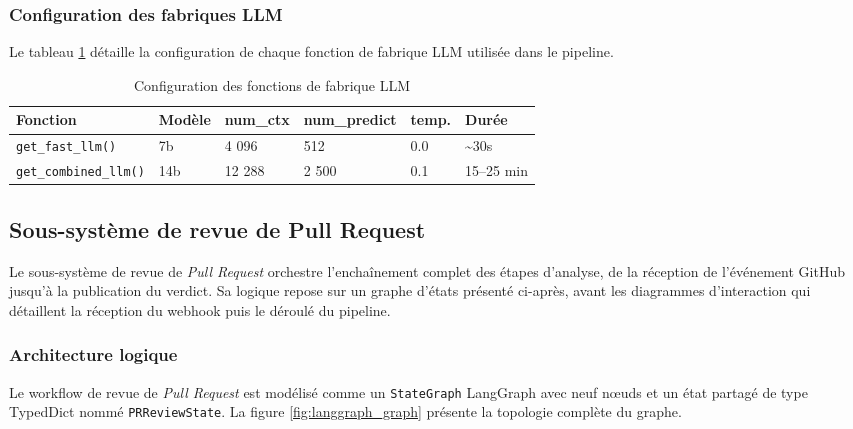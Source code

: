         \subsubsection{Configuration des fabriques LLM}

        Le tableau \ref{tab:llm_factories} détaille la configuration de chaque fonction de
        fabrique LLM utilisée dans le pipeline.

        \begin{table}[H]
        \centering
        \begin{tabular}{|m{3.5cm}|m{2cm}|m{2cm}|m{2cm}|m{2cm}|m{2.5cm}|}
        \hline
        \textbf{Fonction} & \textbf{Modèle} & \textbf{num\_ctx} & \textbf{num\_predict} & \textbf{temp.} & \textbf{Durée} \\
        \hline
        \texttt{get\_\allowbreak{}fast\_\allowbreak{}llm()} & 7b & 4 096 & 512 & 0.0 & \textasciitilde30s \\
        \hline
        \texttt{get\_\allowbreak{}combined\_\allowbreak{}llm()} & 14b & 12 288 & 2 500 & 0.1 & 15–25 min \\
        \hline
        \end{tabular}
        \caption{Configuration des fonctions de fabrique LLM}
        \label{tab:llm_factories}
        \end{table}

    \subsection{Sous-système de revue de Pull Request}

        Le sous-système de revue de \textit{Pull Request} orchestre l'enchaînement complet
        des étapes d'analyse, de la réception de l'événement GitHub jusqu'à la publication
        du verdict. Sa logique repose sur un graphe d'états présenté ci-après, avant les
        diagrammes d'interaction qui détaillent la réception du webhook puis le déroulé du
        pipeline.

        \subsubsection{Architecture logique}

        Le workflow de revue de \textit{Pull Request} est modélisé comme un
        \texttt{StateGraph} LangGraph \cite{LangGraph} avec neuf nœuds et un état partagé
        de type TypedDict nommé \texttt{PRReviewState}. La figure \ref{fig:langgraph_graph}
        présente la topologie complète du graphe.

